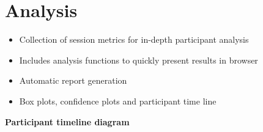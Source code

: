 \vspace{-0.8cm}

{\color{emphasisered} \section{Analysis}}


\normalsize

\begin{itemize}%
	\item Collection of session metrics for in-depth participant analysis
	\item Includes analysis functions to quickly present results in browser
	\item Automatic report generation
	\item Box plots, confidence plots and participant time line
\end{itemize}
\vspace{-1cm}

\begin{center}
\small
\textbf{Participant timeline diagram}
\end{center}

\vspace{-0.3cm}
